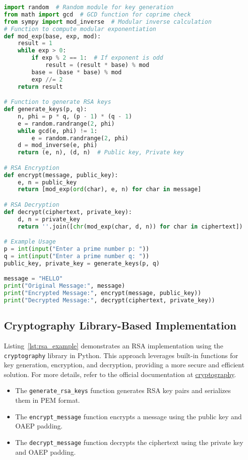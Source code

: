 \documentclass[12pt,a4paper]{report}
\begin{document}
\begin{lstlisting}[language=Python, caption=RSA Encryption and Decryption Example (Python 3.8+), label={lst:rsa_example_generic}]
import random  # Random module for key generation
from math import gcd  # GCD function for coprime check
from sympy import mod_inverse  # Modular inverse calculation
# Function to compute modular exponentiation
def mod_exp(base, exp, mod):
    result = 1
    while exp > 0:
        if exp % 2 == 1:  # If exponent is odd
            result = (result * base) % mod
        base = (base * base) % mod
        exp //= 2
    return result

# Function to generate RSA keys
def generate_keys(p, q):
    n, phi = p * q, (p - 1) * (q - 1)
    e = random.randrange(2, phi)
    while gcd(e, phi) != 1:
        e = random.randrange(2, phi)
    d = mod_inverse(e, phi)
    return (e, n), (d, n)  # Public key, Private key

# RSA Encryption
def encrypt(message, public_key):
    e, n = public_key
    return [mod_exp(ord(char), e, n) for char in message]

# RSA Decryption
def decrypt(ciphertext, private_key):
    d, n = private_key
    return ''.join([chr(mod_exp(char, d, n)) for char in ciphertext])

# Example Usage
p = int(input("Enter a prime number p: "))
q = int(input("Enter a prime number q: "))
public_key, private_key = generate_keys(p, q)

message = "HELLO"
print("Original Message:", message)
print("Encrypted Message:", encrypt(message, public_key))
print("Decrypted Message:", decrypt(ciphertext, private_key))
\end{lstlisting}


\subsection{Cryptography Library-Based Implementation}
Listing~\ref{lst:rsa_example} demonstrates an RSA implementation using the \texttt{cryptography} library in Python. This approach leverages built-in functions for key generation, encryption, and decryption, providing a more secure and efficient solution. For more details, refer to the official documentation at \href{https://cryptography.io/en/latest/hazmat/primitives/asymmetric/rsa/#}{cryptography}.

\begin{itemize}
    \item The {\texttt{generate\_rsa\_keys}} function generates RSA key pairs and serializes them in PEM format.
    \item The \texttt{encrypt\_message} function encrypts a message using the public key and OAEP padding.
    \item The \texttt{decrypt\_message} function decrypts the ciphertext using the private key and OAEP padding.
\end{itemize}
\end{document}
